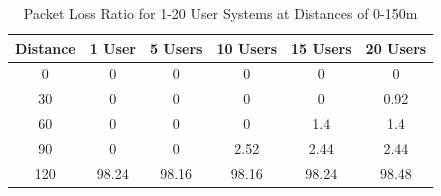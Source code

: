 \begin{table}[H]
	\centering
	\caption{Packet Loss Ratio for 1-20 User Systems at Distances of 0-150m}
	\label{tab:QCP3TPTable}
	\begin{tabular}{|c|c|c|c|c|c|}
		\hline
		Distance & 1 User & 5 Users & 10 Users & 15 Users & 20 Users\\
		\hline
		0 & 0 & 0 & 0 & 0 & 0\\
		30 & 0 & 0 & 0 & 0 & 0.92\\
		60 & 0 & 0 & 0 & 1.4 & 1.4\\
		90 & 0 & 0 & 2.52 & 2.44 & 2.44\\
		120 & 98.24 & 98.16 & 98.16 & 98.24 & 98.48\\
		\hline
	\end{tabular}
\end{table}
